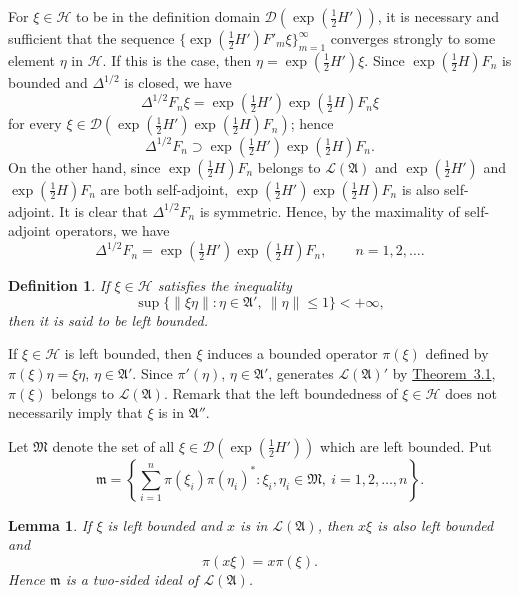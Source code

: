 \documentclass[12pt,b5paper,twoside]{article}
\theoremstyle{takesaki}
\newtheorem{lemma}{Lemma}[section]
\newtheorem{definition}{Definition}[section]
\numberwithin{equation}{section}
\begin{document}
For $\xi\in\mathcal H$ to be in the definition domain
$\mathcal D(\exp(\tfrac12H'))$, it is necessary and sufficient that
the sequence
$\{\exp(\tfrac12H')F'_m\xi\}_{m=1}^{\infty}$ converges strongly to
some element $\eta$ in $\mathcal H$.  If this is the case, then
$\eta=\exp(\tfrac12H')\xi$.  Since $\exp(\tfrac12H)F_n$ is bounded and
$\Delta^{1/2}$ is closed, we have
\[
  \Delta^{1/2}F_n\xi
   =\exp\!\left(\tfrac12H'\right)
     \exp\!\left(\tfrac12H\right)F_n\xi
\]
for every
$\xi\in\mathcal D(\exp(\tfrac12H')\exp(\tfrac12H)F_n)$; hence
\[
  \Delta^{1/2}F_n
  \supset
  \exp\!\left(\tfrac12H'\right)
  \exp\!\left(\tfrac12H\right)F_n.
\]
On the other hand, since $\exp(\tfrac12H)F_n$ belongs to
$\mathcal L(\mathfrak A)$ and $\exp(\tfrac12H')$ and
$\exp(\tfrac12H)F_n$ are both self-adjoint,
$\exp(\tfrac12H')\exp(\tfrac12H)F_n$ is also self-adjoint.  It is
clear that $\Delta^{1/2}F_n$ is symmetric.  Hence, by the maximality of
self-adjoint operators, we have
\begin{equation}
  \Delta^{1/2}F_n
   =\exp\!\left(\tfrac12H'\right)
    \exp\!\left(\tfrac12H\right)F_n,
  \qquad n=1,2,\ldots.
  \tag{14.7}\label{eq:14.7}
\end{equation}

\begin{definition}\label{def:14.1}
If $\xi\in\mathcal H$ satisfies the inequality
\[
  \sup\{\|\xi\eta\|:\eta\in\mathfrak A',\ \|\eta\|\leq1\}<+\infty,
\]
then it is said to be \emph{left bounded}.
\end{definition}

If $\xi\in\mathcal H$ is left bounded, then $\xi$ induces a bounded
operator $\pi(\xi)$ defined by
$\pi(\xi)\eta=\xi\eta$, $\eta\in\mathfrak A'$.  Since
$\pi'(\eta)$, $\eta\in\mathfrak A'$, generates
$\mathcal L(\mathfrak A)'$ by \hyperref[thm:3.1]{Theorem~3.1},
$\pi(\xi)$ belongs to $\mathcal L(\mathfrak A)$.  Remark that the left
boundedness of $\xi\in\mathcal H$ does not necessarily imply that
$\xi$ is in $\mathfrak A''$.

Let $\mathfrak M$ denote the set of all
$\xi\in\mathcal D(\exp(\tfrac12H'))$ which are left bounded.  Put
\begin{equation}
  \mathfrak m=
  \left\{
    \sum_{i=1}^{n}\pi(\xi_i)\pi(\eta_i)^*:
    \xi_i,\eta_i\in\mathfrak M,\ i=1,2,\ldots,n
  \right\}.
  \tag{14.8}\label{eq:14.8}
\end{equation}

\begin{lemma}\label{lem:14.1}
If $\xi$ is left bounded and $x$ is in $\mathcal L(\mathfrak A)$,
then $x\xi$ is also left bounded and
\begin{equation}
  \pi(x\xi)=x\pi(\xi).
  \tag{14.9}\label{eq:14.9}
\end{equation}
Hence $\mathfrak m$ is a two-sided ideal of
$\mathcal L(\mathfrak A)$.
\end{lemma}
\end{document}
